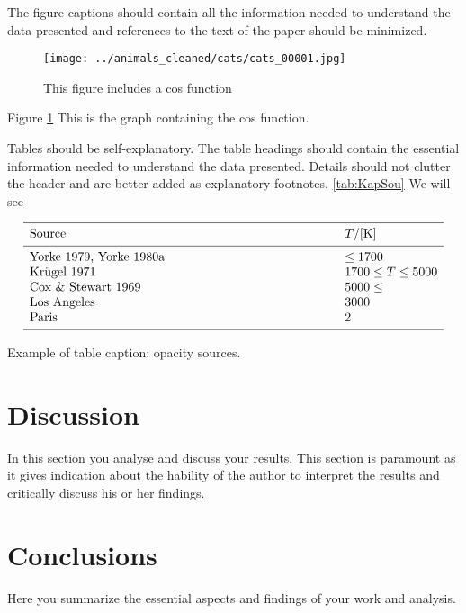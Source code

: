 \documentclass[a4paper,10pt]{article}
\begin{document}
The figure captions should contain all the information needed to 
understand the data presented and references to the text of the paper 
should be minimized.


\begin{figure}[htb]
  \centering
  \texttt{[image: ../animals\_cleaned/cats/cats\_00001.jpg]}
     \caption{This figure includes a cos function}
         \label{Fig:Fig1}
\end{figure}

Figure \ref {Fig:Fig1} This is the graph containing the cos function.

Tables should be self-explanatory. The table headings should contain 
the essential information needed to understand the data presented. 
Details should not clutter the header and are better added as explanatory 
footnotes. \ref{tab:KapSou} We will see

\begin{table}[htb]
      
     $$ 
         \begin{array}{p{0.7\linewidth}l}
            \hline
            \noalign{\smallskip}
            Source      &  T / {[\mathrm{K}]} \\
            \noalign{\smallskip}
            \hline
            \noalign{\smallskip}
            Yorke 1979, Yorke 1980a & \leq 1700           \\
            Kr\"ugel 1971           & 1700 \leq T \leq 5000 \\
            Cox \& Stewart 1969     & 5000 \leq             \\
            Los Angeles & 3000\\
            Paris & 2\\
            \noalign{\smallskip}
            \hline
         \end{array}
     $$ 
     \caption[]{Example of table caption: opacity sources.}
         \label{tab:KapSou}
\end{table}

\section{Discussion}
In this section you analyse and discuss your results.
This section is paramount as it gives indication about the 
hability of the author to interpret the results and 
critically discuss his or her findings.

\section{Conclusions}
Here you summarize the essential aspects and findings 
of your work and analysis.
\end{document}
